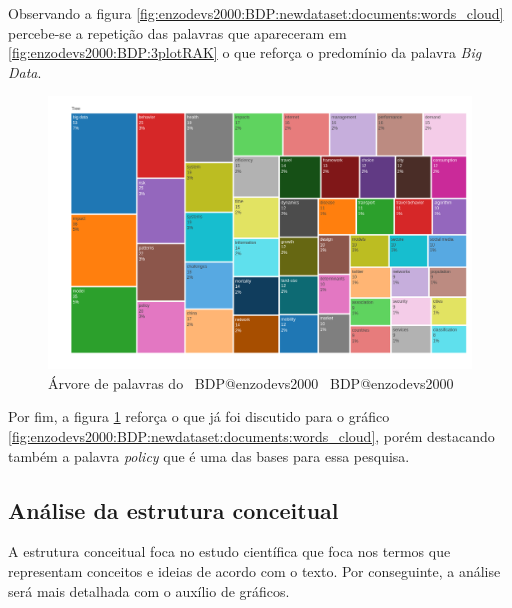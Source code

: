 Observando a figura \ref{fig:enzodevs2000:BDP:newdataset:documents:words_cloud} percebe-se a repetição das palavras que apareceram em \ref{fig:enzodevs2000:BDP:3plotRAK} o que reforça o predomínio da palavra \textit{Big Data}.

\begin{figure}[H]
    \centering
    \includegraphics[width=1\textwidth]{experiments/enzodevs2000/AnaliseBibliometrica/BigDataInPolicy/Figures/Graficos/NovoDataset/Documents/TreeMap.png}
    \caption{Árvore de palavras do \dataset\ BDP@enzodevs2000
    \dataset\ BDP@enzodevs2000}
    \label{fig:enzodevs2000:BDP:newdataset:documents:tree_map}
\end{figure}

 Por fim, a figura \ref{fig:enzodevs2000:BDP:newdataset:documents:tree_map} reforça o que já foi discutido para o gráfico \ref{fig:enzodevs2000:BDP:newdataset:documents:words_cloud}, porém destacando também a palavra \textit{policy} que é uma das bases para essa pesquisa.
 
 \subsection{Análise da estrutura conceitual}
 
 A estrutura conceitual foca no estudo científica que foca nos termos que representam conceitos e ideias de acordo com o texto. Por conseguinte, a análise será mais detalhada com o auxílio de gráficos.
 
